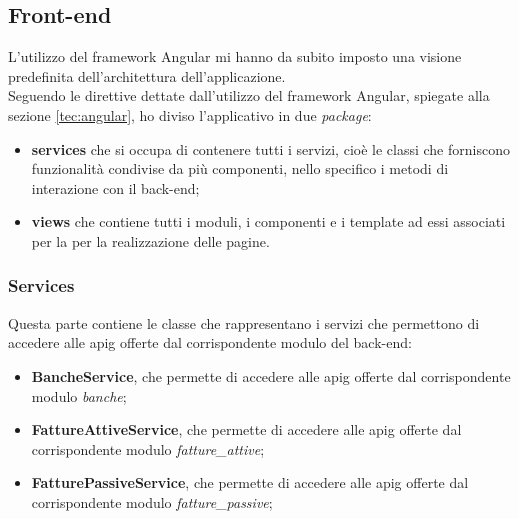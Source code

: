 	\subsection{Front-end}
	L’utilizzo del framework Angular mi hanno da subito imposto una visione predefinita dell’architettura dell’applicazione. \\
	Seguendo le direttive dettate dall'utilizzo del framework Angular, spiegate alla sezione \ref{tec:angular}, ho diviso l'applicativo in due \emph{package}:
	\begin{itemize}
		\item \textbf{services} che si occupa di contenere tutti i servizi, cioè le classi che forniscono funzionalità condivise da più componenti, nello specifico i metodi di interazione con il back-end;
		\item \textbf{views} che contiene tutti i moduli, i componenti e i template ad essi associati per la per la realizzazione delle pagine.
	\end{itemize}
	
	\subsubsection{Services}
	Questa parte contiene le classe che rappresentano i servizi che permettono di accedere alle \gls{apig} offerte dal corrispondente modulo del back-end:
	\begin{itemize}
		\item \textbf{BancheService}, che permette di accedere alle \gls{apig} offerte dal corrispondente modulo \textit{banche};
		\item \textbf{FattureAttiveService}, che permette di accedere alle \gls{apig} offerte dal corrispondente modulo \textit{fatture\_attive};
		\item \textbf{FatturePassiveService}, che permette di accedere alle \gls{apig} offerte dal corrispondente modulo \textit{fatture\_passive};
	\end{itemize}
	
